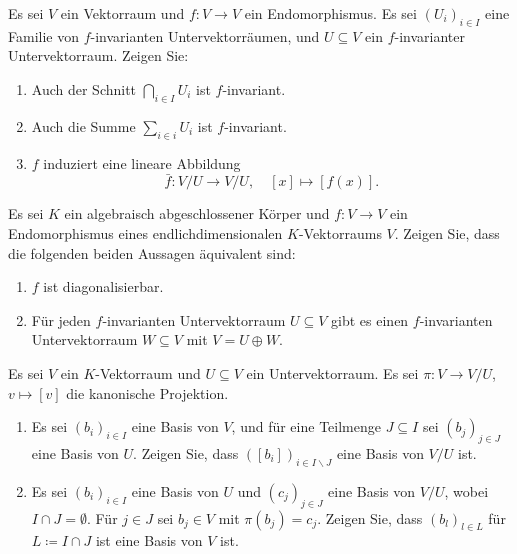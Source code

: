 \documentclass[a4paper,10pt]{scrartcl}
\begin{document}
\begin{question}
  Es sei $V$ ein Vektorraum und $f \colon V \to V$ ein Endomorphismus.
  Es sei $(U_i)_{i \in I}$ eine Familie von $f$-invarianten Untervektorräumen, und $U \subseteq V$ ein $f$-invarianter Untervektorraum.
  Zeigen Sie:
  \begin{enumerate}[leftmargin=*]
    \item
      Auch der Schnitt $\bigcap_{i \in I} U_i$ ist $f$-invariant.
    \item
      Auch die Summe $\sum_{i \in i} U_i$ ist $f$-invariant.
    \item
      $f$ induziert eine lineare Abbildung
      \[
        \bar{f} \colon V/U \to V/U,
        \quad
        [x] \mapsto [f(x)].
      \]
  \end{enumerate}
\end{question}


\begin{question}
  Es sei $K$ ein algebraisch abgeschlossener Körper und $f \colon V \to V$ ein Endomorphismus eines endlichdimensionalen $K$-Vektorraums $V$.
  Zeigen Sie, dass die folgenden beiden Aussagen äquivalent sind:
  \begin{enumerate}
    \item
      $f$ ist diagonalisierbar.
    \item
      Für jeden $f$-invarianten Untervektorraum $U \subseteq V$ gibt es einen $f$-invarianten Untervektorraum $W \subseteq V$ mit $V = U \oplus W$.
  \end{enumerate}
\end{question}


\begin{question}
  Es sei $V$ ein $K$-Vektorraum und $U \subseteq V$ ein Untervektorraum.
  Es sei $\pi \colon V \to V/U$, $v \mapsto [v]$ die kanonische Projektion.
  \begin{enumerate}[leftmargin=*]
    \item
      Es sei $(b_i)_{i \in I}$ eine Basis von $V$, und für eine Teilmenge $J \subseteq I$ sei $(b_j)_{j \in J}$ eine Basis von $U$.
      Zeigen Sie, dass $([b_i])_{i \in I \smallsetminus J}$ eine Basis von $V/U$ ist.
    \item
      Es sei $(b_i)_{i \in I}$ eine Basis von $U$ und $(c_j)_{j \in J}$ eine Basis von $V/U$, wobei $I \cap J = \emptyset$.
      Für $j \in J$ sei $b_j \in V$ mit $\pi(b_j) = c_j$.
      Zeigen Sie, dass $(b_l)_{l \in L}$ für $L \coloneqq I \cap J$ ist eine Basis von $V$ ist.
  \end{enumerate}
\end{question}
\end{document}
